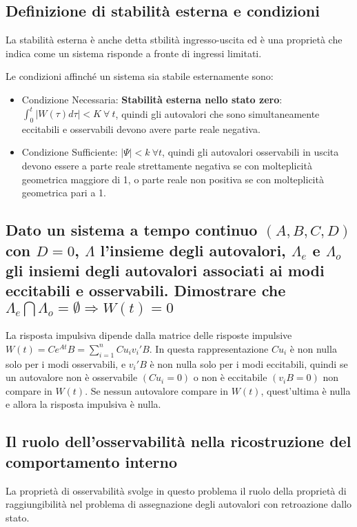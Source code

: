 \documentclass{article}
\begin{document}
\subsection{Definizione di stabilità esterna e condizioni}
La stabilità esterna è anche detta stbilità ingresso-uscita
ed è una proprietà che indica come un sistema risponde
a fronte di ingressi limitati.

Le condizioni affinché un sistema sia stabile esternamente sono:
\begin{itemize}
\item Condizione Necessaria: \textbf{Stabilità esterna nello stato zero}:
\(\displaystyle \int_{0}^{t} |W(\tau)d\tau|< K\ \forall\ t\),
quindi gli autovalori che sono simultaneamente eccitabili e osservabili
devono avere parte reale negativa.
\item Condizione Sufficiente: $|\Psi|<k\ \forall t$,
quindi gli autovalori osservabili in uscita devono essere a parte
reale strettamente negativa se con molteplicità geometrica maggiore di 1,
o parte reale non positiva se con molteplicità geometrica pari a 1.
\end{itemize}

\subsection{\boldmath Dato un sistema a tempo continuo $(A, B, C, D)$ con $D = 0$, $\Lambda$
l'insieme degli
autovalori, $\Lambda_e$ e $\Lambda_o$ gli insiemi degli autovalori associati ai modi eccitabili e
osservabili. Dimostrare che $\Lambda_e  \bigcap\Lambda_o = \emptyset \Longrightarrow W(t) = 0$}

La risposta impulsiva dipende dalla matrice delle risposte impulsive
$W(t)=Ce^{At}B=\sum_{i=1}^{n}C u_i v_i' B$.
In questa rappresentazione $C u_i$ è non nulla solo per i modi osservabili,
e $v_i'B$ è non nulla solo per i modi eccitabili,
quindi se un autovalore non è osservabile $(Cu_i=0)$ o non è eccitabile $(v_iB=0)$
non compare in $W(t)$.
Se nessun autovalore compare in $W(t)$, quest'ultima è nulla e allora la risposta impulsiva è nulla.


\subsection{Il ruolo dell'osservabilità nella ricostruzione del comportamento interno}
La proprietà di osservabilità svolge in questo problema il
ruolo della proprietà di raggiungibilità nel problema
di assegnazione degli autovalori con retroazione dallo stato.
\end{document}
